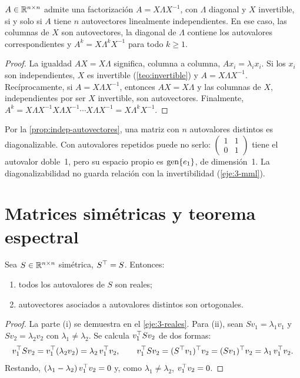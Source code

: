 \begin{teorema}[Diagonalización]\label{teo:diagonalizacion}
$A\in\mathbb{R}^{n\times n}$ admite una factorización $A=X\Lambda X^{-1}$, con $\Lambda$ diagonal y $X$ invertible, si y solo si $A$ tiene $n$ autovectores linealmente independientes. En ese caso, las columnas de $X$ son autovectores, la diagonal de $\Lambda$ contiene los autovalores correspondientes y $A^{k}=X\Lambda^{k}X^{-1}$ para todo $k\ge 1$.
\end{teorema}

\begin{proof}
La igualdad $AX=X\Lambda$ significa, columna a columna, $Ax_i=\lambda_ix_i$. Si los $x_i$ son independientes, $X$ es invertible (\cref{teo:invertible}) y $A=X\Lambda X^{-1}$. Recíprocamente, si $A=X\Lambda X^{-1}$, entonces $AX=X\Lambda$ y las columnas de $X$, independientes por ser $X$ invertible, son autovectores. Finalmente, $A^{k}=X\Lambda X^{-1}X\Lambda X^{-1}\cdots X\Lambda X^{-1}=X\Lambda^{k}X^{-1}$.
\end{proof}

Por la \cref{prop:indep-autovectores}, una matriz con $n$ autovalores distintos es diagonalizable. Con autovalores repetidos puede no serlo: $\begin{pmatrix}1&1\\0&1\end{pmatrix}$ tiene el autovalor doble~1, pero su espacio propio es $\operatorname{gen}\{e_1\}$, de dimensión~1. La diagonalizabilidad no guarda relación con la invertibilidad (\cref{eje:3-mml}).

\section{Matrices simétricas y teorema espectral}

\begin{teorema}\label{teo:simetricas}
Sea $S\in\mathbb{R}^{n\times n}$ simétrica, $S^{\top}=S$. Entonces:
\begin{enumerate}
  \item todos los autovalores de $S$ son reales;
  \item autovectores asociados a autovalores distintos son ortogonales.
\end{enumerate}
\end{teorema}

\begin{proof}
La parte (i) se demuestra en el \cref{eje:3-reales}. Para (ii), sean $Sv_1=\lambda_1v_1$ y $Sv_2=\lambda_2v_2$ con $\lambda_1\ne\lambda_2$. Se calcula $v_1^{\top} Sv_2$ de dos formas:
\[
v_1^{\top} Sv_2=v_1^{\top}(\lambda_2v_2)=\lambda_2\,v_1^{\top} v_2,\qquad
v_1^{\top} Sv_2=(S^{\top} v_1)^{\top} v_2=(Sv_1)^{\top} v_2=\lambda_1\,v_1^{\top} v_2.
\]
Restando, $(\lambda_1-\lambda_2)\,v_1^{\top} v_2=0$ y, como $\lambda_1\ne\lambda_2$, $v_1^{\top} v_2=0$.
\end{proof}

